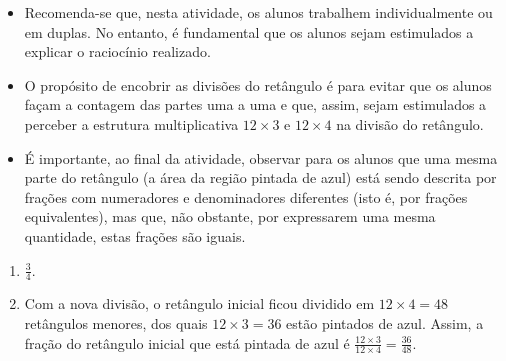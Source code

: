 \begin{orientacoes}{}{}

\begin{itemize} %
    \item       Recomenda-se que, nesta atividade, os alunos trabalhem
individualmente ou em duplas. No entanto, é fundamental que os alunos sejam
estimulados a explicar o raciocínio realizado.
    \item       O propósito de encobrir as divisões do retângulo é para evitar
que os alunos façam a contagem das partes uma a uma e que, assim, sejam
estimulados a perceber a estrutura multiplicativa       $12 \times 3$       e
   $12 \times 4$       na divisão do retângulo.
    \item       É importante, ao final da atividade, observar para os alunos que
uma mesma parte do retângulo (a área da região pintada de azul) está sendo
descrita por frações com numeradores e denominadores diferentes (isto é, por
frações equivalentes), mas que, não obstante, por expressarem uma mesma
quantidade, estas frações são iguais.
\end{itemize} %


   \vspace{.1cm}


\end{orientacoes}

\begin{solucao}{}{}
\begin{enumerate} [\quad a)] %
    \item             $\frac{3}{4}$.
    \item       Com a nova divisão, o retângulo inicial ficou dividido em       $12
\times 4 = 48$ retângulos menores, dos quais       $12 \times 3 = 36$       estão
pintados de azul. Assim, a fração do retângulo inicial que está pintada de azul é
      $\frac{12 \times 3}{12 \times 4} = \frac{36}{48}$.
\end{enumerate} %

\end{solucao}

